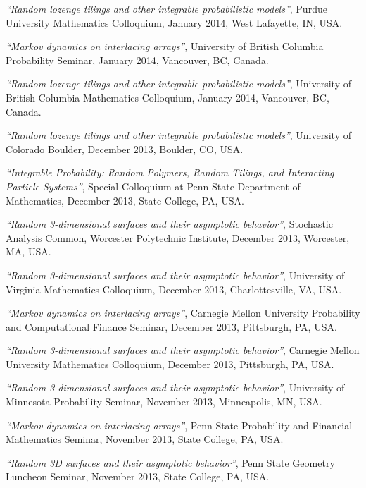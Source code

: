 \documentclass[letterpaper,11pt]{article}
\begin{document}
\begin{etaremune}
  \item \emph{``Random lozenge tilings and other integrable probabilistic models''},
  Purdue University Mathematics Colloquium,
  January 2014, West Lafayette, IN, USA.
  \item
  \emph{``Markov dynamics on interlacing arrays''},
  University of British Columbia Probability Seminar,
  January 2014, Vancouver, BC, Canada.
  \item \emph{``Random lozenge tilings and other integrable probabilistic models''},
  University of British Columbia Mathematics Colloquium, 
  January 2014, Vancouver, BC, Canada.
  \item \emph{``Random lozenge tilings and other integrable probabilistic models''},
  University of Colorado Boulder, 
  December 2013, Boulder, CO, USA.
  \item
  \emph{``Integrable Probability:
  Random Polymers,
  Random Tilings, 
  and Interacting Particle Systems''},
  Special Colloquium at 
  Penn State Department of Mathematics,
  December 2013, 
  State College, PA, USA.
  \item
  \emph{``Random 3-dimensional surfaces and their asymptotic behavior''},
  Stochastic Analysis Common, Worcester Polytechnic Institute,
  December 2013,
  Worcester, MA, USA.
  \item
  \emph{``Random 3-dimensional surfaces and their asymptotic behavior''},
  University of Virginia Mathematics Colloquium,
  December 2013, Charlottesville, VA, USA.
  \item
  \emph{``Markov dynamics on interlacing arrays''},
  Carnegie Mellon University Probability and Computational Finance Seminar,
  December 2013, Pittsburgh, PA, USA.
  \item
  \emph{``Random 3-dimensional surfaces and their asymptotic behavior''},
  Carnegie Mellon University Mathematics Colloquium,
  December 2013, Pittsburgh, PA, USA.
  \item 
  \emph{``Random 3-dimensional surfaces and their asymptotic behavior''},
  University of Minnesota Probability Seminar,
  November 2013, 
  Minneapolis, MN, USA.
  \item 
  \emph{``Markov dynamics on interlacing arrays''},
  Penn State Probability and Financial Mathematics Seminar,
  November 2013, 
  State College, PA, USA.
  \item 
  \emph{``Random 3D surfaces and their asymptotic behavior''},
  Penn State Geometry Luncheon Seminar,
  November 2013, 
  State College, PA, USA.

\end{etaremune}
\end{document}
